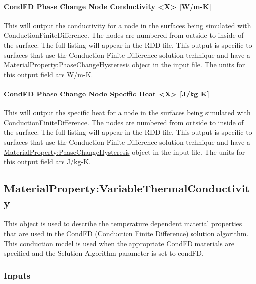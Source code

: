 \paragraph{CondFD Phase Change Node Conductivity \textless{}X\textgreater{} {[}W/m-K{]}}\label{condfd-phase-change-node-conductivity-x-w-m-k}

This will output the conductivity for a node in the surfaces being simulated with ConductionFiniteDifference.  The nodes are numbered from outside to inside of the surface. The full listing will appear in the RDD file.  This output is specific to surfaces that use the Conduction Finite Difference solution technique and have a \hyperref[materialpropertyphasechangehysteresis]{MaterialProperty:PhaseChangeHysteresis} object in the input file.  The units for this output field are W/m-K.

\paragraph{CondFD Phase Change Node Specific Heat \textless{}X\textgreater{} {[}J/kg-K{]}}\label{condfd-phase-change-node-specific-heat-x-j-kg-k}

This will output the specific heat for a node in the surfaces being simulated with ConductionFiniteDifference.  The nodes are numbered from outside to inside of the surface. The full listing will appear in the RDD file.  This output is specific to surfaces that use the Conduction Finite Difference solution technique and have a \hyperref[materialpropertyphasechangehysteresis]{MaterialProperty:PhaseChangeHysteresis} object in the input file. The units for this output field are J/kg-K.

\subsection{MaterialProperty:VariableThermalConductivity}\label{materialpropertyvariablethermalconductivity}

This object is used to describe the temperature dependent material properties that are used in the CondFD (Conduction Finite Difference) solution algorithm. This conduction model is used when the appropriate CondFD materials are specified and the Solution Algorithm parameter is set to condFD.

\subsubsection{Inputs}\label{inputs-6-027}

